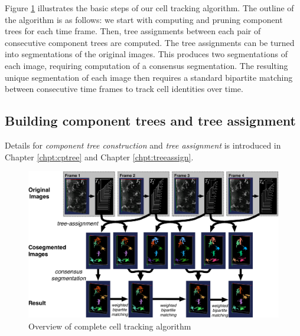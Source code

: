 Figure \ref{fig:coseg-fig3} illustrates the basic steps of our cell tracking algorithm. The outline of the algorithm is as follows: we start with computing and pruning component trees for each time frame. Then, tree assignments between each pair of consecutive component trees are computed. The tree assignments can be turned into segmentations of the original images. This produces two segmentations of each image, requiring computation of a consensus segmentation. The resulting unique segmentation of each image then requires a standard bipartite matching between consecutive time frames to track cell identities over time. 

\subsection{Building component trees and tree assignment}
Details for \emph{component tree construction} and \emph{tree assignment} is introduced in Chapter \ref{chpt:cptree} and Chapter \ref{chpt:treeassign}.

\begin{figure}[htbp]
\centering
\includegraphics[width=1.0\textwidth]{images/coseg_fig3}
\caption{Overview of complete cell tracking algorithm}
\label{fig:coseg-fig3}
\end{figure}

